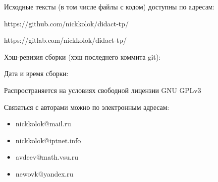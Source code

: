 Исходные тексты (в том числе файлы с кодом) доступны по адресам:

https://github.com/nickkolok/didact-tp/

https://gitlab.com/nickkolok/didact-tp/

Хэш-ревизия сборки (хэш последнего коммита git):


Дата и время сборки:


Распространяется на условиях свободной лицензии GNU GPLv3

Связаться с авторами можно по электронным адресам:
\begin{itemize}
	\item
		nickkolok@mail.ru
	\item
		nickkolok@iptnet.info
	\item
		avdeev@math.vsu.ru
	\item
		newovk@yandex.ru
\end{itemize}
